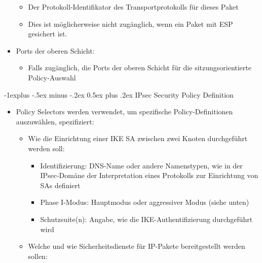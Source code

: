 \documentclass[a4paper]{article}
\makeatletter
\renewcommand{\subsection}{\@startsection{subsection}{2}{0mm}%
 {-1explus -.5ex minus -.2ex}%
 {0.5ex plus .2ex}%
 {\normalfont\normalsize\bfseries}}
\makeatother
\begin{document}
\begin{multicols}{3}
\begin{itemize}
              \begin{itemize}
                  \item
                        Der Protokoll-Identifikator des Transportprotokolls für dieses Paket
                  \item
                        Dies ist möglicherweise nicht zugänglich, wenn ein Paket mit ESP
                        gesichert ist.
              \end{itemize}
        \item
              Ports der oberen Schicht:

              \begin{itemize}
                  \item
                        Falls zugänglich, die Ports der oberen Schicht für die
                        sitzungsorientierte Policy-Auswahl
              \end{itemize}
    \end{itemize}


    \subsection{IPsec Security Policy
        Definition}

    \begin{itemize}
        \item
              Policy Selectors werden verwendet, um spezifische Policy-Definitionen
              auszuwählen, spezifiziert:

              \begin{itemize}
                  \item
                        Wie die Einrichtung einer IKE SA zwischen zwei Knoten durchgeführt
                        werden soll:

                        \begin{itemize}
                            \item
                                  Identifizierung: DNS-Name oder andere Namenstypen, wie in der
                                  IPsec-Domäne der Interpretation eines Protokolls zur Einrichtung
                                  von SAs definiert
                            \item
                                  Phase I-Modus: Hauptmodus oder aggressiver Modus (siehe unten)
                            \item
                                  Schutzsuite(n): Angabe, wie die IKE-Authentifizierung durchgeführt
                                  wird
                        \end{itemize}
                  \item
                        Welche und wie Sicherheitsdienste für IP-Pakete bereitgestellt
                        werden sollen:


\end{itemize}
\end{itemize}
\end{multicols}
\end{document}
